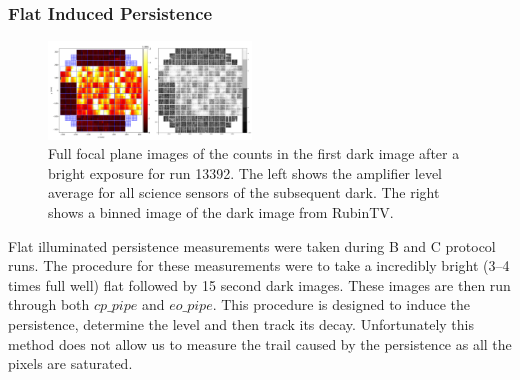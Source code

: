 \documentclass[DM,authoryear,toc]{lsstdoc}
\begin{document}
\subsubsection{Flat Induced Persistence}
\begin{figure}[!htp]
  \centering
  \includegraphics[width=0.48\textwidth, angle=0]{Ex_Flat_FP_combined.png}
  \caption{
  Full focal plane images of the counts in the first dark image after a bright exposure for run 13392.
  The left shows the amplifier level average for all science sensors of the subsequent dark.
  The right shows a binned image of the dark image from RubinTV\@.
  }\label{fig:Flat_Induced}
\end{figure}

Flat illuminated persistence measurements were taken during B and C protocol runs.
The procedure for these measurements were to take a incredibly bright (3--4 times full well) flat followed by 15 second dark images.
These images are then run through both \texttt{$cp\_pipe$} and \texttt{$eo\_pipe$}.
This procedure is designed to induce the persistence, determine the level and then track its decay.
Unfortunately this method does not allow us to measure the trail caused by the persistence as all the pixels are saturated.
\end{document}
